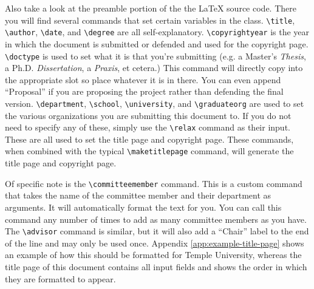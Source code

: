 \documentclass{thesis-dissertation}
\begin{document}
Also take a look at the preamble portion of the the \LaTeX{} source code. There you will find several commands that set certain variables in the class. \verb|\title|, \verb|\author|, \verb|\date|, and \verb|\degree| are all self-explanatory. \verb|\copyrightyear| is the year in which the document is submitted or defended and used for the copyright page. \verb|\doctype| is used to set what it is that you're submitting (e.g. a Master's \textit{Thesis}, a Ph.D. \textit{Dissertation}, a \textit{Praxis}, et cetera.) This command will directly copy into the appropriate slot so place whatever it is in there. You can even append ``Proposal'' if you are proposing the project rather than defending the final version. \verb|\department|, \verb|\school|, \verb|\university|, and \verb|\graduateorg| are used to set the various organizations you are submitting this document to. If you do not need to specify any of these, simply use the \verb|\relax| command as their input. These are all used to set the title page and copyright page. These commands, when combined with the typical \verb|\maketitlepage| command, will generate the title page and copyright page. 

Of specific note is the \verb|\committeemember| command. This is a custom command that takes the name of the committee member and their department as arguments. It will automatically format the text for you. You can call this command any number of times to add as many committee members as you have. The \verb|\advisor| command is similar, but it will also add a ``Chair'' label to the end of the line and may only be used once. Appendix \ref{app:example-title-page} shows an example of how this should be formatted for Temple University, whereas the title page of this document contains all input fields and shows the order in which they are formatted to appear.
\end{document}
